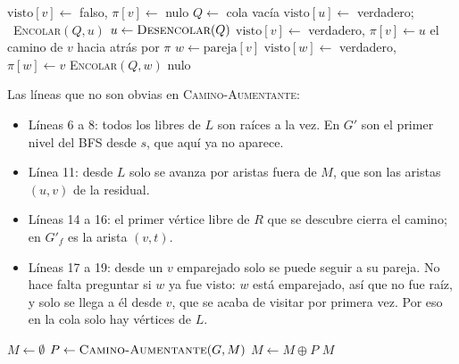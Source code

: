\documentclass[11pt,letterpaper]{article}
\begin{document}
\begin{algorithm}[H]
\caption{\textsc{Camino-Aumentante}$(G, M)$}
\label{alg:emparejamiento-camino}
\begin{algorithmic}[1]
    \State $\text{visto}[v] \gets$ falso, \quad $\pi[v] \gets$ nulo
  \EndFor
  \State $Q \gets$ cola vacía
    \State $\text{visto}[u] \gets$ verdadero; \ \textsc{Encolar}$(Q, u)$
  \EndFor
    \State $u \gets \textsc{Desencolar}(Q)$ 
        \State $\text{visto}[v] \gets$ verdadero, \quad $\pi[v] \gets u$
          \State \Return el camino de $v$ hacia atrás por $\pi$
        \EndIf
        \State $w \gets \text{pareja}[v]$
        \State $\text{visto}[w] \gets$ verdadero, \quad
               $\pi[w] \gets v$
        \State \textsc{Encolar}$(Q, w)$
      \EndIf
    \EndFor
  \EndWhile
  \State \Return nulo
\EndProcedure
\end{algorithmic}
\end{algorithm}

Las líneas que no son obvias en \textsc{Camino-Aumentante}:
\begin{itemize}
  \item Líneas 6 a 8: todos los libres de $L$ son raíces a la vez. En
    $G'$ son el primer nivel del BFS desde $s$, que aquí ya no
    aparece.
  \item Línea 11: desde $L$ solo se avanza por aristas fuera de $M$,
    que son las aristas $(u, v)$ de la residual.
  \item Líneas 14 a 16: el primer vértice libre de $R$ que se descubre
    cierra el camino; en $G'_f$ es la arista $(v, t)$.
  \item Líneas 17 a 19: desde un $v$ emparejado solo se puede seguir a
    su pareja. No hace falta preguntar si $w$ ya fue visto: $w$ está
    emparejado, así que no fue raíz, y solo se llega a él desde $v$,
    que se acaba de visitar por primera vez. Por eso en la cola solo
    hay vértices de $L$.
\end{itemize}

\begin{algorithm}[H]
\caption{\textsc{Emparejamiento-Máximo}$(G, L, R)$}
\label{alg:emparejamiento-maximo}
\begin{algorithmic}[1]
  \State $M \gets \emptyset$
  \Repeat
    \State $P \gets \textsc{Camino-Aumentante}(G, M)$
      \State $M \gets M \oplus P$ 
    \EndIf
  \State \Return $M$
\EndProcedure
\end{algorithmic}
\end{algorithm}
\end{document}

